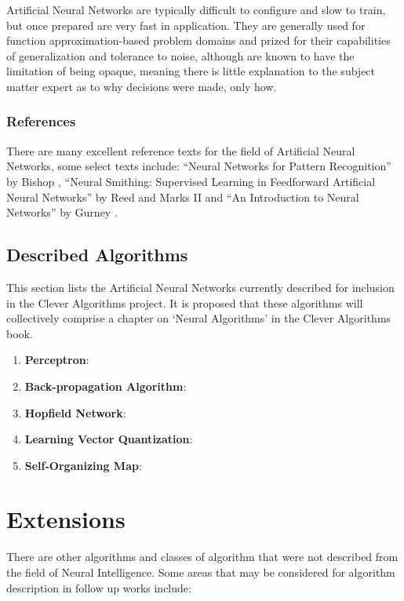 \documentclass[a4paper, 11pt]{article}
\begin{document}
Artificial Neural Networks are typically difficult to configure and slow to train, but once prepared are very fast in application. They are generally used for function approximation-based problem domains and prized for their capabilities of generalization and tolerance to noise, although are known to have the limitation of being opaque, meaning there is little explanation to the subject matter expert as to why decisions were made, only how.

\subsubsection{References}
There are many excellent reference texts for the field of Artificial Neural Networks, some select texts include: ``Neural Networks for Pattern Recognition'' by Bishop \cite{Bishop1995}, ``Neural Smithing: Supervised Learning in Feedforward Artificial Neural Networks'' by Reed and Marks II \cite{Reed1999} and ``An Introduction to Neural Networks'' by Gurney \cite{Gurney1997}.

% 
% 
\subsection{Described Algorithms}
\label{subsec:algorithms}
This section lists the Artificial Neural Networks currently described for inclusion in the Clever Algorithms project. It is proposed that these algorithms will collectively comprise a chapter on `Neural Algorithms' in the Clever Algorithms book. 

\begin{enumerate}
	\item \textbf{Perceptron}: \cite{Brownlee2010af}
	\item \textbf{Back-propagation Algorithm}: \cite{Brownlee2010ag}
	\item \textbf{Hopfield Network}: \cite{Brownlee2010ah}
	\item \textbf{Learning Vector Quantization}: \cite{Brownlee2010ai}
	\item \textbf{Self-Organizing Map}: \cite{Brownlee2010aj}
\end{enumerate}

% 
% 
\section{Extensions}
\label{sec:extensions}
There are other algorithms and classes of algorithm that were not described from the field of Neural Intelligence. Some areas that may be considered for algorithm description in follow up works include:
\end{document}
